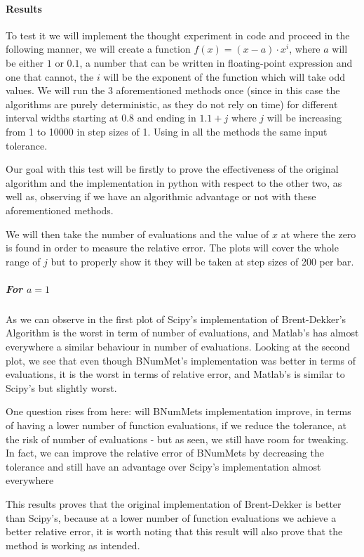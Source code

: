 \paragraph{Results}
To test it we will implement the thought experiment in code and proceed in the following manner, we will create a function $f(x) = (x-a)\cdot x^{i}$, where $a$ will be either $1$ or $0.1$, a number that can be written in floating-point expression and one that cannot, the $i$ will be the exponent of the function which will take odd values. We will run the 3 aforementioned methods once (since in this case the algorithms are purely deterministic, as they do not rely on time) for different interval widths starting at $0.8$ and ending in $1.1+j$ where $j$ will be increasing from 1 to 10000 in step sizes of 1. Using in all the methods the same input tolerance.

Our goal with this test will be firstly to prove the effectiveness of the original algorithm and the implementation in python with respect to the other two, as well as, observing if we have an algorithmic advantage or not with these aforementioned methods.

We will then take the number of evaluations and the value of $x$ at where the zero is found in order to measure the relative error. The plots will cover the whole range of $j$ but to properly show it they will be taken at step sizes of 200 per bar.

\subparagraph{For $a=1$}
As we can observe in the first plot of  Scipy's implementation of Brent-Dekker's Algorithm is the worst in term of number of evaluations, and Matlab's has almost everywhere a similar behaviour in number of evaluations. Looking at the second plot, we see that even though BNumMet's implementation was better in terms of evaluations, it is the worst in terms of relative error, and Matlab's is similar to Scipy's but slightly worst.

One question rises from here: will BNumMets implementation improve, in terms of having a lower number of function evaluations, if we reduce the tolerance, at the risk of number of evaluations - but as seen, we still have room for tweaking. In fact, we can improve the relative error of BNumMets by decreasing the tolerance and still have an advantage over Scipy's implementation almost everywhere 

This results proves that the original implementation of Brent-Dekker is better than Scipy's, because at a lower number of function evaluations we achieve a better relative error, it is worth noting that this result will also prove that the method is working as intended. 

